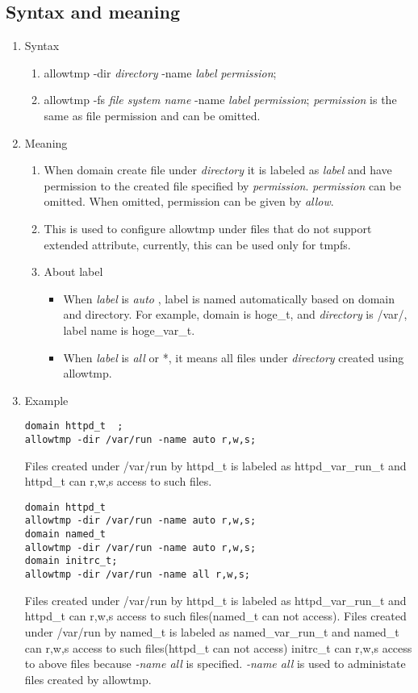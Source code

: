 \documentclass{article}
\begin{document}
\subsection{Syntax and meaning}
\begin{enumerate}
 \item Syntax
       \begin{enumerate}
	\item allowtmp -dir {\it directory} -name {\it label} {\it
	      permission};
	\item  allowtmp -fs {\it file system name} -name {\it label} {\it
	      permission};
	      {\it permission} is the same as file permission and can be omitted.
       \end{enumerate}
 \item Meaning\\
       \begin{enumerate}
	\item When domain create file under {\it directory} it is
	      labeled as {\it label} and have permission to the created
	      file specified by {\it permission}. {\it permission} can
	      be omitted. When omitted, permission can be given by {\it allow}.
	\item This is used to configure allowtmp under files that do not
	      support extended attribute, currently, this can be used
	      only for tmpfs.
	\item About label
	      \begin{itemize}
	       \item When {\it label} is {\it auto }, label is named
		     automatically based on domain and directory. For example,
		     domain is hoge\_t, and {\it directory} is /var/, label
		     name is hoge\_var\_t.
	       \item When {\it label} is {\it all} or *, it means all
		     files under {\it directory} created using allowtmp.
	      \end{itemize}           
       \end{enumerate}       
 \item Example\\
       \begin{verbatim}
domain httpd_t	;
allowtmp -dir /var/run -name auto r,w,s;
       \end{verbatim}
Files created under /var/run by httpd\_t is labeled as
       httpd\_var\_run\_t and httpd\_t can r,w,s access to such files.

\begin{verbatim}
domain httpd_t
allowtmp -dir /var/run -name auto r,w,s;
domain named_t
allowtmp -dir /var/run -name auto r,w,s;
domain initrc_t;
allowtmp -dir /var/run -name all r,w,s;
\end{verbatim}
Files created under /var/run by httpd\_t is labeled as
       httpd\_var\_run\_t and httpd\_t can r,w,s access to such
       files(named\_t can not access).
Files created under /var/run by named\_t is labeled as
       named\_var\_run\_t and named\_t can r,w,s access to such
       files(httpd\_t can not access)
initrc\_t can r,w,s access to above files because {\it -name all} is
       specified. {\it -name all} is used to administate files created
       by allowtmp.


\end{enumerate}
\end{document}

